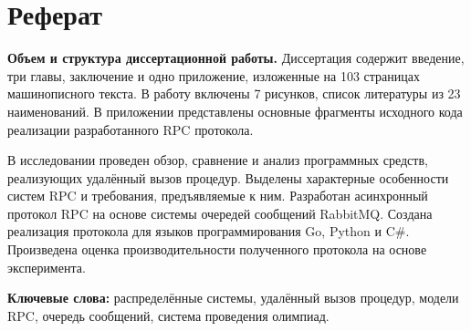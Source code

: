 \chapter*{Реферат}
\textbf{Объем и структура диссертационной работы.}
Диссертация содержит введение, три главы, заключение и одно приложение,
изложенные на 103 страницах машинописного текста.
В работу включены 7 рисунков, список литературы из 23 наименований.
В приложении представлены основные фрагменты исходного кода реализации
разработанного RPC протокола.

В исследовании проведен обзор, сравнение и анализ программных средств,
реализующих удалённый вызов процедур.
Выделены характерные особенности систем RPC и требования, предъявляемые к ним.
Разработан асинхронный протокол RPC на основе системы очередей сообщений
RabbitMQ. Создана реализация протокола для языков программирования Go, Python
и C\#. Произведена оценка производительности полученного протокола на основе
эксперимента.

\textbf{Ключевые слова:}
распределённые системы,
удалённый вызов процедур,
модели RPC,
очередь сообщений,
система проведения олимпиад.

